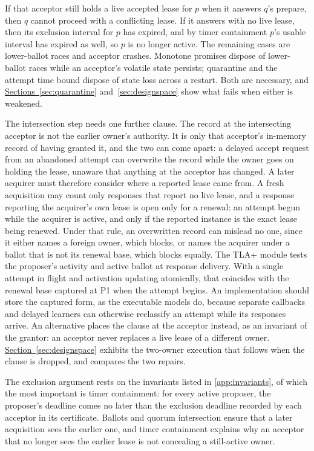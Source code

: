 \documentclass[final,5p,times,twocolumn,number]{elsarticle}
\newcommand{\secref}[1]{\hyperref[#1]{Section~\ref*{#1}}}
\newcommand{\secsref}[2]{\hyperref[#1]{Sections~\ref*{#1}} and~\hyperref[#2]{\ref*{#2}}}
\begin{document}
If that acceptor still holds a live accepted lease for $p$ when it answers $q$'s prepare, then $q$ cannot proceed with a conflicting lease.  If it answers with no live lease, then its exclusion interval for $p$ has expired, and by timer containment $p$'s usable interval has expired as well, so $p$ is no longer active.  The remaining cases are lower-ballot races and acceptor crashes.  Monotone promises dispose of lower-ballot races while an acceptor's volatile state persists; quarantine and the attempt time bound dispose of state loss across a restart.  Both are necessary, and \secsref{sec:quarantine}{sec:designspace} show what fails when either is weakened.

The intersection step needs one further clause.  The record at the intersecting acceptor is not the earlier owner's authority.  It is only that acceptor's in-memory record of having granted it, and the two can come apart: a delayed accept request from an abandoned attempt can overwrite the record while the owner goes on holding the lease, unaware that anything at the acceptor has changed.  A later acquirer must therefore consider where a reported lease came from.  A fresh acquisition may count only responses that report no live lease, and a response reporting the acquirer's own lease is open only for a renewal: an attempt begun while the acquirer is active, and only if the reported instance is the exact lease being renewed.  Under that rule, an overwritten record can mislead no one, since it either names a foreign owner, which blocks, or names the acquirer under a ballot that is not its renewal base, which blocks equally.  The TLA+ module tests the proposer's activity and active ballot at response delivery.  With a single attempt in flight and activation updating atomically, that coincides with the renewal base captured at P1 when the attempt begins.  An implementation should store the captured form, as the executable models do, because separate callbacks and delayed learners can otherwise reclassify an attempt while its responses arrive.  An alternative places the clause at the acceptor instead, as an invariant of the grantor: an acceptor never replaces a live lease of a different owner.  \secref{sec:designspace} exhibits the two-owner execution that follows when the clause is dropped, and compares the two repairs.

The exclusion argument rests on the invariants listed in \ref{app:invariants}, of which the most important is timer containment: for every active proposer, the proposer's deadline comes no later than the exclusion deadline recorded by each acceptor in its certificate.  Ballots and quorum intersection ensure that a later acquisition sees the earlier one, and timer containment explains why an acceptor that no longer sees the earlier lease is not concealing a still-active owner.
\end{document}
